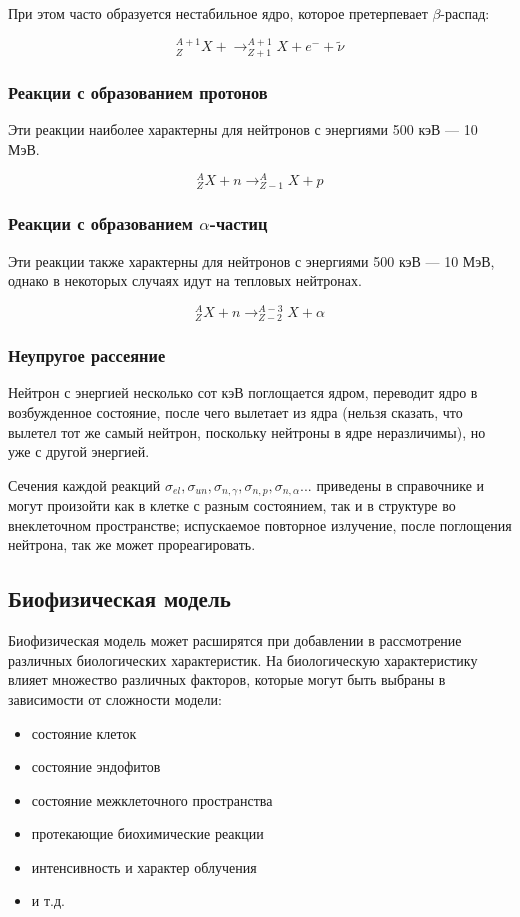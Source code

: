 \documentclass[11pt]{article}
\begin{document}
	При этом часто образуется нестабильное ядро, которое претерпевает $\beta$-распад:

	\begin{equation}
	\label{eq2}
	^{A+1}_ZX+ \rightarrow ^{A+1}_{Z+1}X + e^- + \tilde{\nu}
	\end{equation}
	
	\subsubsection{Реакции с образованием протонов}
	Эти реакции наиболее характерны для нейтронов с энергиями 500 кэВ — 10 МэВ.
	
	\begin{equation}
		\label{eq3}
		^A_ZX+n \rightarrow ^A_{Z-1}X + p
	\end{equation}
	
	\subsubsection{Реакции с образованием $\alpha$-частиц}
	Эти реакции также характерны для нейтронов с энергиями 500 кэВ — 10 МэВ, однако в некоторых случаях идут на тепловых нейтронах.
	
	\begin{equation}
		\label{eq4}
		^A_ZX+n \rightarrow ^{A-3}_{Z-2}X + \alpha
	\end{equation}
	
	\subsubsection{Неупругое рассеяние}
	Нейтрон с энергией несколько сот кэВ поглощается ядром, переводит ядро в возбужденное состояние, после чего вылетает из ядра (нельзя сказать, что вылетел тот же самый нейтрон, поскольку нейтроны в ядре неразличимы), но уже с другой энергией.
	
	Сечения каждой реакций $\sigma_{el},\sigma_{un}, \sigma_{n,\gamma}, \sigma_{n,p}, \sigma_{n,\alpha} ... $ приведены в справочнике и могут произойти как в клетке с разным состоянием, так и в структуре во внеклеточном пространстве; испускаемое повторное излучение, после поглощения нейтрона, так же может прореагировать.
	
	\subsection{Биофизическая модель}
	Биофизическая модель может расширятся при добавлении в рассмотрение различных биологических характеристик. На биологическую характеристику влияет множество различных факторов, которые могут быть выбраны в зависимости от сложности модели:
	\begin{itemize} 
	\item состояние клеток
	\item состояние эндофитов
	\item состояние межклеточного пространства
	\item протекающие биохимические реакции
	\item интенсивность и характер облучения
	\item и т.д.
	\end{itemize} 
	
\end{document}
